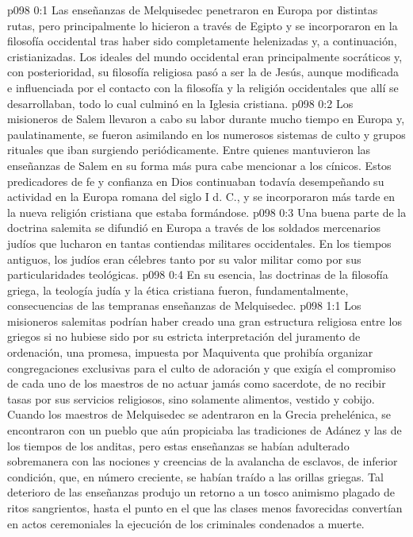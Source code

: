 \author{Melquisedec}
\vs p098 0:1 Las enseñanzas de Melquisedec penetraron en Europa por distintas rutas, pero principalmente lo hicieron a través de Egipto y se incorporaron en la filosofía occidental tras haber sido completamente helenizadas y, a continuación, cristianizadas. Los ideales del mundo occidental eran principalmente socráticos y, con posterioridad, su filosofía religiosa pasó a ser la de Jesús, aunque modificada e influenciada por el contacto con la filosofía y la religión occidentales que allí se desarrollaban, todo lo cual culminó en la Iglesia cristiana.
\vs p098 0:2 Los misioneros de Salem llevaron a cabo su labor durante mucho tiempo en Europa y, paulatinamente, se fueron asimilando en los numerosos sistemas de culto y grupos rituales que iban surgiendo periódicamente. Entre quienes mantuvieron las enseñanzas de Salem en su forma más pura cabe mencionar a los cínicos. Estos predicadores de fe y confianza en Dios continuaban todavía desempeñando su actividad en la Europa romana del siglo I d. C., y se incorporaron más tarde en la nueva religión cristiana que estaba formándose.
\vs p098 0:3 Una buena parte de la doctrina salemita se difundió en Europa a través de los soldados mercenarios judíos que lucharon en tantas contiendas militares occidentales. En los tiempos antiguos, los judíos eran célebres tanto por su valor militar como por sus particularidades teológicas.
\vs p098 0:4 En su esencia, las doctrinas de la filosofía griega, la teología judía y la ética cristiana fueron, fundamentalmente, consecuencias de las tempranas enseñanzas de Melquisedec.
\vs p098 1:1 Los misioneros salemitas podrían haber creado una gran estructura religiosa entre los griegos si no hubiese sido por su estricta interpretación del juramento de ordenación, una promesa, impuesta por Maquiventa que prohibía organizar congregaciones exclusivas para el culto de adoración y que exigía el compromiso de cada uno de los maestros de no actuar jamás como sacerdote, de no recibir tasas por sus servicios religiosos, sino solamente alimentos, vestido y cobijo. Cuando los maestros de Melquisedec se adentraron en la Grecia prehelénica, se encontraron con un pueblo que aún propiciaba las tradiciones de Adánez y las de los tiempos de los anditas, pero estas enseñanzas se habían adulterado sobremanera con las nociones y creencias de la avalancha de esclavos, de inferior condición, que, en número creciente, se habían traído a las orillas griegas. Tal deterioro de las enseñanzas produjo un retorno a un tosco animismo plagado de ritos sangrientos, hasta el punto en el que las clases menos favorecidas convertían en actos ceremoniales la ejecución de los criminales condenados a muerte.
